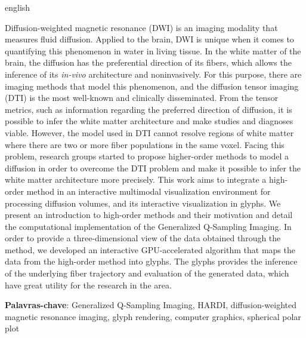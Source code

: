 \documentclass[
    12pt,                %
    oneside,            %
    a4paper,            %
    english,            %
    french,                %
    spanish,            %
    brazil                %
    ]{abntex2}
\begin{document}
\begin{resumo}[Abstract]
 \begin{otherlanguage*}{english}
 
Diffusion-weighted magnetic resonance (DWI) is an imaging modality that measures fluid diffusion. Applied to the brain, DWI is unique when it comes to quantifying this phenomenon in water in living tissue. In the white matter of the brain, the diffusion has the preferential direction of its fibers, which allows the inference of its \textit{in-vivo} architecture and noninvasively. For this purpose, there are imaging methods that model this phenomenon, and the diffusion tensor imaging (DTI) is the most well-known and clinically disseminated. From the tensor metrics, such as information regarding the preferred direction of diffusion, it is possible to infer the white matter architecture and make studies and diagnoses viable. However, the model used in DTI cannot resolve regions of white matter where there are two or more fiber populations in the same voxel. Facing this problem, research groups started to propose higher-order methods to model a diffusion in order to overcome the DTI problem and make it possible to infer the white matter architecture more precisely. This work aims to integrate a high-order method in an interactive multimodal visualization environment for processing diffusion volumes, and its interactive visualization in glyphs. We present an introduction to high-order methods and their motivation and detail the computational implementation of the Generalized Q-Sampling Imaging. In order to provide a three-dimensional view of the data obtained through the method, we developed an interactive GPU-accelerated algorithm that maps the data from the high-order method into glyphs. The glyphs provides the inference of the underlying fiber trajectory and evaluation of the generated data, which have great utility for the research in the area.

\vspace{\onelineskip}
\noindent\textbf{Palavras-chave}: Generalized Q-Sampling Imaging, HARDI, diffusion-weighted magnetic resonance imaging, glyph rendering, computer graphics, spherical polar plot
 \end{otherlanguage*}
\end{resumo}


\listoffigures*
\cleardoublepage

\listoftables*
\cleardoublepage
\end{document}
